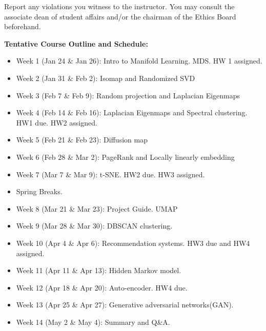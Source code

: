 \documentclass[a4paper,10pt]{article}
\begin{document}
Report any violations you witness to the instructor. You may consult the associate dean of student affairs 
and/or the chairman of the Ethics Board beforehand. 

\textbf{Tentative Course Outline and Schedule:}


\begin{itemize}

\item Week 1 (Jan 24 \& Jan 26): Intro to Manifold Learning. MDS. HW 1 assigned. 

\item Week 2 (Jan 31 \& Feb 2): Isomap and  Randomized SVD


\item Week 3 (Feb 7 \& Feb 9):  Random projection and Laplacian Eigenmaps 

\item Week 4 (Feb 14 \& Feb 16): Laplacian Eigenmaps and Spectral clustering.  HW1 due. HW2 assigned.

\item Week 5 (Feb 21 \& Feb 23):  Diffusion map

\item Week 6 (Feb 28 \& Mar 2): PageRank and Locally linearly embedding

\item Week 7 (Mar 7 \& Mar 9): t-SNE. HW2 due. HW3 assigned. 

\item Spring Breaks.

\item Week 8 (Mar 21 \& Mar 23): Project Guide. UMAP

\item Week 9 (Mar 28 \& Mar 30): DBSCAN clustering.

\item Week 10 (Apr 4 \& Apr 6):  Recommendation systems. HW3 due and HW4 assigned.  

\item Week 11 (Apr 11 \& Apr 13):  Hidden Markov model.

\item Week 12 (Apr 18 \& Apr 20):  Auto-encoder.  HW4 due. 

\item Week 13 (Apr 25 \& Apr 27):  Generative adversarial networks(GAN).

\item Week 14 (May 2 \& May 4): Summary and Q\&A. 
 
\end{itemize}
\end{document}
